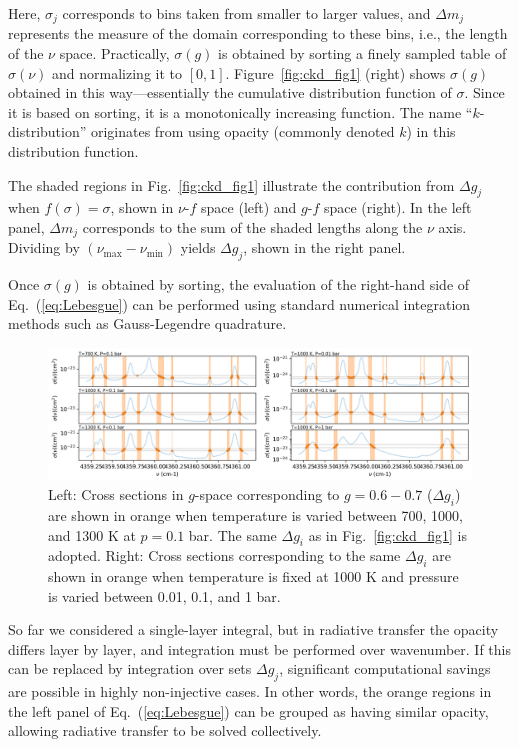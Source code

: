 Here, $\sigma_j$ corresponds to bins taken from smaller to larger values, and $\Delta m_j$ represents the measure of the domain corresponding to these bins, i.e., the length of the $\nu$ space.  
Practically, $\sigma(g)$ is obtained by sorting a finely sampled table of $\sigma(\nu)$ and normalizing it to $[0,1]$.  
Figure~\ref{fig:ckd_fig1} (right) shows $\sigma(g)$ obtained in this way—essentially the cumulative distribution function of $\sigma$.  
Since it is based on sorting, it is a monotonically increasing function.  
The name ``$k$-distribution'' originates from using opacity (commonly denoted $k$) in this distribution function.

The shaded regions in Fig.~\ref{fig:ckd_fig1} illustrate the contribution from $\Delta g_j$ when $f(\sigma) = \sigma$, shown in $\nu$-$f$ space (left) and $g$-$f$ space (right).  
In the left panel, $\Delta m_j$ corresponds to the sum of the shaded lengths along the $\nu$ axis.  
Dividing by $(\nu_\mathrm{max} - \nu_\mathrm{min})$ yields $\Delta g_j$, shown in the right panel.

Once $\sigma(g)$ is obtained by sorting, the evaluation of the right-hand side of Eq.~(\ref{eq:Lebesgue}) can be performed using standard numerical integration methods such as Gauss-Legendre quadrature.

\begin{figure}[!h]
    \centering
    \includegraphics[width=1.0\linewidth]{fig/ckd/corrk_corr.png}
    \caption{Left: Cross sections in $g$-space corresponding to $g=0.6-0.7$ ($\Delta g_i$) are shown in orange when temperature is varied between 700, 1000, and 1300 K at $p=0.1$ bar. The same $\Delta g_i$ as in Fig.~\ref{fig:ckd_fig1} is adopted. Right: Cross sections corresponding to the same $\Delta g_i$ are shown in orange when temperature is fixed at 1000 K and pressure is varied between 0.01, 0.1, and 1 bar.}
    \label{fig:ckd_fig2}
\end{figure}

So far we considered a single-layer integral, but in radiative transfer the opacity differs layer by layer, and integration must be performed over wavenumber.  
If this can be replaced by integration over sets $\Delta g_j$, significant computational savings are possible in highly non-injective cases.  
In other words, the orange regions in the left panel of Eq.~(\ref{eq:Lebesgue}) can be grouped as having similar opacity, allowing radiative transfer to be solved collectively.  


